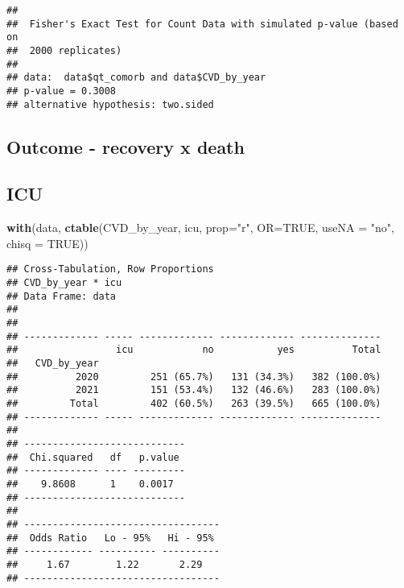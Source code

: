 \documentclass[
]{article}
\newenvironment{Shaded}{\begin{snugshade}}{\end{snugshade}}
\newcommand{\AttributeTok}[1]{\textcolor[rgb]{0.13,0.29,0.53}{#1}}
\newcommand{\ConstantTok}[1]{\textcolor[rgb]{0.56,0.35,0.01}{#1}}
\newcommand{\FunctionTok}[1]{\textcolor[rgb]{0.13,0.29,0.53}{\textbf{#1}}}
\newcommand{\NormalTok}[1]{#1}
\newcommand{\SpecialCharTok}[1]{\textcolor[rgb]{0.81,0.36,0.00}{\textbf{#1}}}
\newcommand{\StringTok}[1]{\textcolor[rgb]{0.31,0.60,0.02}{#1}}
\begin{document}
\begin{Shaded}
\end{Shaded}

\begin{verbatim}
## 
##  Fisher's Exact Test for Count Data with simulated p-value (based on
##  2000 replicates)
## 
## data:  data$qt_comorb and data$CVD_by_year
## p-value = 0.3008
## alternative hypothesis: two.sided
\end{verbatim}

\hypertarget{outcome---recovery-x-death}{%
\subsection{Outcome - recovery x
death}\label{outcome---recovery-x-death}}

\hypertarget{icu}{%
\subsection{ICU}\label{icu}}

\begin{Shaded}
\begin{Highlighting}[]
\FunctionTok{with}\NormalTok{(data, }\FunctionTok{ctable}\NormalTok{(CVD\_by\_year, icu, }\AttributeTok{prop=}\StringTok{"r"}\NormalTok{, }\AttributeTok{OR=}\ConstantTok{TRUE}\NormalTok{, }\AttributeTok{useNA =} \StringTok{"no"}\NormalTok{, }\AttributeTok{chisq =} \ConstantTok{TRUE}\NormalTok{))}
\end{Highlighting}
\end{Shaded}

\begin{verbatim}
## Cross-Tabulation, Row Proportions  
## CVD_by_year * icu  
## Data Frame: data  
## 
## 
## ------------- ----- ------------- ------------- --------------
##                 icu            no           yes          Total
##   CVD_by_year                                                 
##          2020         251 (65.7%)   131 (34.3%)   382 (100.0%)
##          2021         151 (53.4%)   132 (46.6%)   283 (100.0%)
##         Total         402 (60.5%)   263 (39.5%)   665 (100.0%)
## ------------- ----- ------------- ------------- --------------
## 
## ----------------------------
##  Chi.squared   df   p.value 
## ------------- ---- ---------
##    9.8608      1    0.0017  
## ----------------------------
## 
## ----------------------------------
##  Odds Ratio   Lo - 95%   Hi - 95% 
## ------------ ---------- ----------
##     1.67        1.22       2.29   
## ----------------------------------
\end{verbatim}
\end{document}
